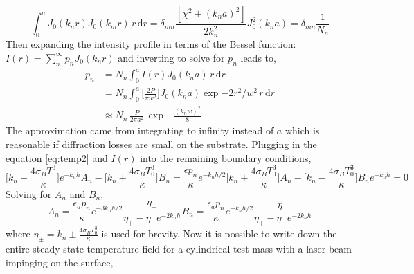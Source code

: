 	\begin{equation}
	\int_{0}^{a} J_0(k_n r) J_0(k_m r) \,r \, \text{d}r= \delta_{mn} \frac{[\chi^2 + (k_na)^2]}{2k_n^2} J^2_0(k_na) = \delta_{mn} \frac{1}{N_n}
	\end{equation}
	Then expanding the intensity profile in terms of the Bessel function: $I(r)= \sum_{n}^{\infty} p_n J_0(k_n r)$ and inverting to solve for $p_n$ leads to,
	\begin{equation}
	\begin{aligned}\label{eq:p_n_gauss}
	p_n &= N_n \int_{0}^{a} I(r) J_0(k_n a) \, r \, \text{d}r\\
		&= N_n \int_{0}^{a} \bigg[\frac{2 P}{\pi w^2}\bigg] J_0(k_n a) \exp{-2r^2/w^2} \, r \, \text{d}r\\
		&\approx N_n \, \frac{P}{2\pi a^2} \, \exp{-\frac{(k_n w )^2}{8} } 
	\end{aligned}
	\end{equation}
	The approximation came from integrating to infinity instead of $a$ which is reasonable if diffraction losses are small on the substrate.  Plugging in the equation \ref{eq:temp2} and $I(r)$ into the remaining boundary conditions,
	\begin{subequations}
		\begin{equation}
		\bigg[ k_n - \frac{4\sigma_B T_0^3}{\kappa}\bigg] e^{-k_nh} A _n - \bigg[ k_n + \frac{4\sigma_B T_0^3}{\kappa}\bigg] B_n = \frac{\epsilon p_n  }{\kappa} e^{-k_nh/2}
		\end{equation}
		\begin{equation}
		\bigg[ k_n + \frac{4\sigma_B T_0^3}{\kappa} \bigg] A _n - \bigg[ k_n - \frac{4\sigma_B T_0^3}{\kappa}\bigg] B_n e^{-k_nh} = 0
		\end{equation}
	\end{subequations}
	Solving for $A_n$ and $B_n$,
	\begin{subequations}
		\begin{equation}
			A_n = \frac{\epsilon_a p_n}{\kappa} e^{-3k_n h /2} \frac{\eta_{+}}{\eta_{+} - \eta_{-} e^{-2k_n h} }
		\end{equation}
		\begin{equation}
			B_n = \frac{\epsilon_a p_n}{\kappa} e^{-k_n h /2} \frac{\eta_{-}}{\eta_{+} - \eta_{-} e^{-2k_n h} }
		\end{equation}
	\end{subequations}
	where $\eta_{\pm} = k_n \pm \frac{4\sigma_B T_0^3}{\kappa}$ is used for brevity. Now it is possible to write down the entire steady-state temperature field for a cylindrical test mass with a laser beam impinging on the surface,
